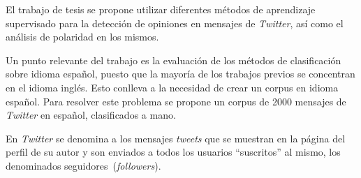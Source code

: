 El trabajo de tesis se propone utilizar diferentes métodos de aprendizaje 
supervisado para la detección de opiniones en mensajes de \emph{Twitter},
así como el análisis de polaridad en los mismos. 

Un punto relevante del trabajo es la evaluación de los métodos de clasificación sobre
idioma español, puesto que la mayoría de los trabajos previos se concentran en el idioma inglés.
Esto conlleva a la necesidad de crear un corpus en idioma español. Para resolver 
este problema se propone un corpus de 2000 mensajes de \emph{Twitter} en español,
clasificados a mano.

En \emph{Twitter} se denomina a los
mensajes \emph{tweets} que se muestran en la página del perfil de su autor y son enviados a
todos los usuarios ``suscritos'' al mismo, los denominados seguidores~(\emph{followers}). 

